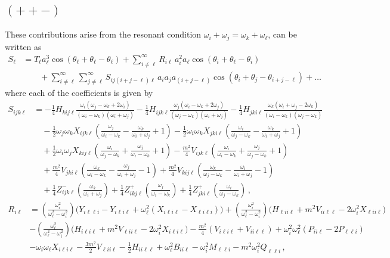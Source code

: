 \documentclass[letterpaper,11pt]{article}
\newcommand{\oi}{\omega_i}
\newcommand{\oj}{\omega_j}
\newcommand{\ok}{\omega_k}
\newcommand{\ol}{\omega_\ell}
\newcommand{\thi}{\theta_i}
\newcommand{\thj}{\theta_j}
\newcommand{\thl}{\theta_\ell}
\begin{document}

\subsection{$(++-)$}
\label{subs: ttf resonances}

These contributions arise from the resonant condition $\oi + \oj = \ok + \ol$, can be written as
\begin{align}
S_\ell &= T_\ell a^3_\ell \cos (\thl + \thl - \thl) + \sum_{i \neq \ell}^\infty R_{i \ell} \, a^2_i a_\ell \cos(\thi + \thl - \thi) \nonumber \\
& \qquad + \sum_{i \neq \ell}^\infty \sum_{j \neq \ell}^\infty S_{i j (i + j - \ell) \ell} \, a_i a_j a_{(i + j - \ell)} \cos(\thi + \thj - \theta_{i + j -\ell} ) + \ldots
\end{align}
where each of the coefficients is given by
\begin{align}
S_{ijk\ell} &= - \frac{1}{4} H_{kij\ell} \frac{\oi (\oj - \ok + 2\oi)}{(\oi - \ok)(\oi + \oj)} -\frac{1}{4} H_{ijk\ell} \frac{\oj (\oi - \ok + 2\oj)}{(\oj - \ok)(\oi + \oj)} - \frac{1}{4} H_{jki\ell} \frac{\ok ( \oi + \oj - 2\ok)}{(\oi - \ok)(\oj - \ok)} \nonumber \\
%
& \quad - \frac{1}{2} \oj \ok X_{ijk\ell} \left( \frac{\oj}{\oi - \ok} - \frac{\ok}{\oi + \oj} + 1 \right) - \frac{1}{2} \oi \ok X_{jki\ell} \left( \frac{\oi}{\oj - \ok} - \frac{\ok}{\oi + \oj} + 1 \right) \nonumber \\
%
& \quad + \frac{1}{2} \oi \oj X_{kij\ell} \left( \frac{\oi}{\oj - \ok} + \frac{\oj}{\oi - \ok} + 1 \right) - \frac{m^2}{4} V_{ijk\ell} \left( \frac{\oi}{\oi - \ok} + \frac{\oj}{\oj - \ok} + 1\right) \nonumber \\
%
& \quad + \frac{m^2}{4} V_{jki\ell} \left( \frac{\ok}{\oi - \ok} - \frac{\oj}{\oi + \oj} - 1 \right) + \frac{m^2}{4} V_{kij\ell} \left( \frac{\ok}{\oj - \ok} - \frac{\oi}{\oi + \oj} - 1 \right) \nonumber \\
%
& \quad + \frac{1}{4}  Z^-_{ijk\ell} \left( \frac{\ok}{\oi + \oj}\right)  + \frac{1}{4}  Z^+_{ikj\ell} \left( \frac{\oj}{\oi - \ok}\right) + \frac{1}{4} Z^+_{jki\ell} \left( \frac{\oi}{\oj - \ok} \right) \, ,
\end{align}
\begin{align}
R_{i\ell} &= \left(\frac{\oi^2}{\ol^2 - \oi^2} \right) \big( Y_{i\ell \ell i} - Y_{i\ell i \ell} + \ol^2 ( X_{i\ell i \ell} - X_{\ell i \ell i}) \big) + \left(\frac{\oi^2}{\ol^2 - \oi^2}\right) \big( H_{\ell i i\ell} + m^2 V_{ii\ell \ell} - 2\oi^2 X_{\ell i i \ell} \big) \nonumber \\
%
& - \left(\frac{\ol^2}{\ol^2 - \oi^2} \right) \big( H_{i\ell i \ell} + m^2 V_{\ell i i \ell} - 2\oi^2 X_{i\ell i\ell} \big) - \frac{m^2}{4}(V_{i\ell i \ell} + V_{ii\ell \ell} ) + \oi^2 \ol^2 (P_{ii\ell} - 2P_{\ell \ell i}) \nonumber \\
%
& - \oi\ol X_{i\ell i \ell} - \frac{3m^2}{2} V_{\ell ii \ell} - \frac{1}{2} H_{ii\ell \ell} + \ol^2 B_{ii\ell} - \oi^2 M_{\ell \ell i} - m^2 \oi^2 Q_{\ell \ell i} \, ,
\end{align}
\end{document}
